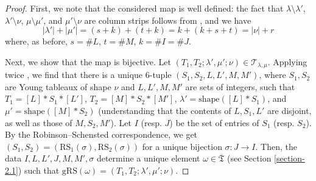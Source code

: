 \documentclass[ALCO,Unicode]{cedram}
\newcommand{\RS}{\mathrm{RS}}
\newcommand{\shape}{\mathrm{shape}}
\newcommand{\card}[1]{\# #1}
\newcommand{\ppermutationsof}{\mathfrak{T}}
\newcommand{\parameters}{\overline{\ppermutationsof}}
\begin{document}
\begin{proof}
First, we note that the considered map is well defined:
the fact that $\lambda\setminus\lambda'$, $\lambda'\setminus\nu$, $\mu\setminus\mu'$, and $\mu'\setminus\nu$ are column strips follows from \cite[Proposition in \S1.1]{Fulton},
and we have
\[
|\lambda'|+|\mu'|=(s+k)+(t+k)=k+(k+s+t)=|\nu|+r
\]
where, as before, $s=\card{L}$, $t=\card{M}$, $k=\card{I}=\card{J}$.

Next, we show that the map is bijective.
Let $(T_1,T_2;\lambda',\mu';\nu)\in\mathcal{T}_{\lambda,\mu}$.
Applying twice \cite[Proposition in \S1.1]{Fulton}, we find that there is a unique 6-tuple
$(S_1,S_2,L,L',M,M')$, where $S_1,S_2$ are Young tableaux of shape $\nu$
and $L,L',M,M'$ are sets of integers, such that $T_1=[L]*S_1*[L']$, $T_2=[M]*S_2*[M']$,
$\lambda'=\shape([L]*S_1)$, and $\mu'=\shape([M]*S_2)$
(understanding that the contents of $L,S_1,L'$ are disjoint, as well as those of $M,S_2,M'$).
Let $I$ (resp. $J$) be the set of entries of $S_1$ (resp. $S_2$).
By the Robinson--Schensted correspondence, we get $(S_1,S_2)=(\RS_1(\sigma),\RS_2(\sigma))$
for a unique bijection $\sigma:J\to I$. Then, the data
$I,L,L',J,M,M',\sigma$ determine a unique element $\omega\in\parameters$ (see Section \ref{section-2.1}) such that $\mathrm{gRS}(\omega)=(T_1,T_2;\lambda',\mu';\nu)$.
\end{proof}
\end{document}
